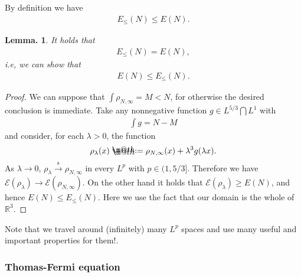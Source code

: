 \documentclass[openany, a4paper, oneside]{book}
\makeatletter
\newcommand*{\defeq}{\mathrel{\rlap{%
\raisebox{0.3ex}{$\m@th\cdot$}}%
\raisebox{-0.3ex}{$\m@th\cdot$}}%
=}
\theoremstyle{break}
\newtheorem{lem}[thm]{Lemma.}
\theoremstyle{breakdefn}
\newcommand{\bbRthree}{\mathbb{R}^3}
\newcommand{\calE}{\mathcal{E}}
\newcommand{\EleqN}{E_{\leq}(N)}
\newcommand{\rhoNinfty}{\rho_{N, \infty}}
\newcommand{\sto}{\xrightarrow{\text{s}}}
\makeatother
\begin{document}
By definition we have
\begin{align}
 \EleqN
 \leq
 E (N).
\end{align}
\begin{lem}
 It holds that
 \begin{align}
  \EleqN = E (N),
 \end{align}
 i.e, we can show that
 \begin{align}
  E (N) \leq \EleqN.
 \end{align}
\end{lem}
\begin{proof}
We can suppose that $\int \rhoNinfty = M < N$, for otherwise the desired conclusion is immediate.
Take any nonnegative function $g \in L^{5/3} \bigcap L^{1}$ with
\begin{align}
 \int g = N - M
\end{align}
and consider, for each $\lambda > 0$, the function
\begin{align}
 \rho_{\lambda} (x)
 \defeq
 \rhoNinfty (x) + \lambda^3 g (\lambda x).
\end{align}
As $\lambda \to 0$, $\rho_{\lambda} \sto \rhoNinfty$ in every $L^p$ with $p \in (1, 5/3]$.
Therefore we have $\calE (\rho_{\lambda}) \to \calE (\rhoNinfty)$.
On the other hand it holds that $\calE (\rho_{\lambda}) \geq E (N)$,
and hence $E (N) \leq \EleqN$.
Here we use the fact that our domain is the whole of $\bbRthree$.
\end{proof}

Note that we travel around (infinitely) many $L^p$ spaces and use many useful and important properties for them!.
\subsubsection{Thomas-Fermi equation}
\label{sec-7-10-3-1-3}
\end{document}
